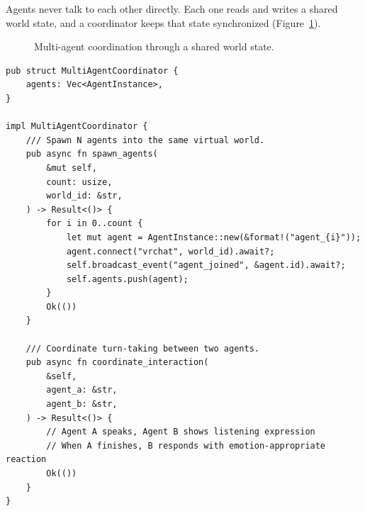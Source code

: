 \documentclass[11pt,letterpaper]{article}
\begin{document}
Agents never talk to each other directly. Each one reads and writes a shared world state, and a coordinator keeps that state synchronized (Figure~\ref{fig:multiagent}).

\begin{figure}[!htbp]
\centering
{}
\caption{Multi-agent coordination through a shared world state.}\label{fig:multiagent}
\end{figure}

\begin{lstlisting}[caption=Multi-Agent Coordination Example]
pub struct MultiAgentCoordinator {
    agents: Vec<AgentInstance>,
}

impl MultiAgentCoordinator {
    /// Spawn N agents into the same virtual world.
    pub async fn spawn_agents(
        &mut self,
        count: usize,
        world_id: &str,
    ) -> Result<()> {
        for i in 0..count {
            let mut agent = AgentInstance::new(&format!("agent_{i}"));
            agent.connect("vrchat", world_id).await?;
            self.broadcast_event("agent_joined", &agent.id).await?;
            self.agents.push(agent);
        }
        Ok(())
    }

    /// Coordinate turn-taking between two agents.
    pub async fn coordinate_interaction(
        &self,
        agent_a: &str,
        agent_b: &str,
    ) -> Result<()> {
        // Agent A speaks, Agent B shows listening expression
        // When A finishes, B responds with emotion-appropriate reaction
        Ok(())
    }
}
\end{lstlisting}
\end{document}
